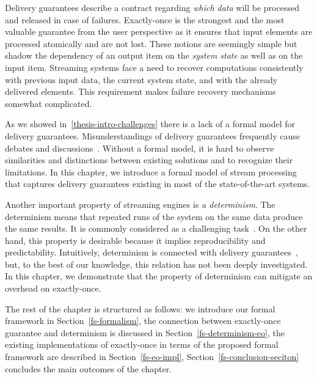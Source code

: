 
Delivery guarantees describe a contract regarding {\em which data} will be processed and released in case of failures. 
Exactly-once is the strongest and the most valuable guarantee from the user perspective as it ensures that input elements are processed atomically and are not lost. These notions are seemingly simple but shadow the dependency of an output item on the {\em system state} as well as on the input item. 
Streaming systems face a need to recover computations consistently with previous input data, the current system state, and with the already delivered elements.
This requirement makes failure recovery mechanisms somewhat complicated.

As we showed in~\ref{thesis-intro-challenges} there is a lack of a  formal model for delivery guarantees. 
Misunderstandings of delivery guarantees frequently cause debates and discussions~\cite{JerryPengStreamIO, PaperTrail}. Without a formal model, it is hard to observe similarities and distinctions between existing solutions and to recognize their limitations. In this chapter, we introduce a formal model of stream processing that captures delivery guarantees existing in most of the state-of-the-art systems.

Another important property of streaming engines is {\em a determinism}. 
The determinism means that repeated runs of the system on the same data produce the same results. It is commonly considered as a challenging task~\cite{Zacheilas:2017:MDS:3093742.3093921}. On the other hand, this property is desirable because it implies reproducibility and predictability. Intuitively, determinism is connected with delivery guarantees~\cite{Stonebraker:2005:RRS:1107499.1107504}, but, to the best of our knowledge, this relation has not been deeply investigated. In this chapter, we demonstrate that the property of determinism can mitigate an overhead on exactly-once. 

The rest of the chapter is structured as follows:
we introduce our formal framework in Section~\ref{fs-formalism},
the connection between exactly-once guarantee and determinism is discussed in Section~\ref{fs-determinism-eo}, 
the existing implementations of exactly-once in terms of the proposed formal framework are described in Section~\ref{fs-eo-impl}, Section~\ref{fs-conclusion-seciton} concludes the main outcomes of the chapter.
